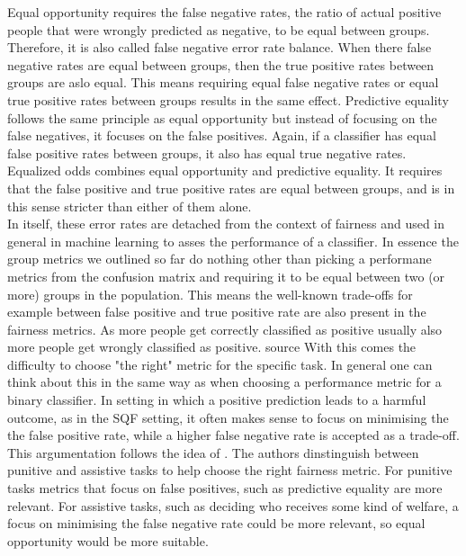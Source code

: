 Equal opportunity requires the false negative rates, the ratio of actual positive people that were wrongly predicted as negative, to be equal between groups.
Therefore, it is also called false negative error rate balance. When there false negative rates are equal between groups, then the true positive rates between groups are aslo equal.
This means requiring equal false negative rates or equal true positive rates between groups results in the same effect. Predictive equality follows the same principle as equal opportunity but instead of focusing on the false negatives, it focuses on the false positives. Again, if a classifier has equal false positive rates between groups, it also has equal true negative rates.
Equalized odds combines equal opportunity and predictive equality. It requires that the false positive and true positive rates are equal between groups, and is in this sense stricter than either of them alone. \\
In itself, these error rates are detached from the context of fairness and used in general in machine learning to asses the performance of a classifier. In essence the group metrics we outlined so far do nothing other than picking a performane metrics from the confusion matrix and requiring it to be equal between two (or more) groups in the population.
This means the well-known trade-offs for example between false positive and true positive rate are also present in the fairness metrics. As more people get correctly classified as positive usually also more people get wrongly classified as positive. {\color{red}source}
With this comes the difficulty to choose "the right" metric for the specific task. In general one can think about this in the same way as when choosing a performance metric for a binary classifier.
In setting in which a positive prediction leads to a harmful outcome, as in the SQF setting, it often makes sense to focus on minimising the the false positive rate, while a higher false negative rate is accepted as a trade-off.
This argumentation follows the idea of . The authors dinstinguish between punitive and assistive tasks to help choose the right fairness metric. For punitive tasks metrics that focus on false positives, such as predictive equality are more relevant. For assistive tasks, such as deciding who receives some kind of welfare, a focus on minimising the false negative rate could be more relevant, so equal opportunity would be more suitable.

